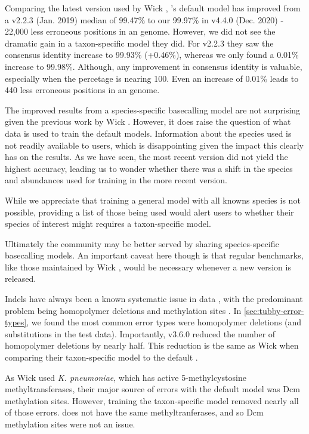 Comparing the latest version used by Wick \etal{}, \guppy{}'s default model has improved from a v2.2.3 (Jan. 2019) median of 99.47\% to our 99.97\% in v4.4.0 (Dec. 2020) - 22,000 less erroneous positions in an \mtb{} genome. However, we did not see the dramatic gain in a taxon-specific model they did. For \guppy{} v2.2.3 they saw the consensus identity increase to 99.93\% (+0.46\%), whereas we only found a 0.01\% increase to 99.98\%. Although, any improvement in consensus identity is valuable, especially when the percetage is nearing 100. Even an increase of 0.01\% leads to 440 less erroneous positions in an \mtb{} genome.

\noindent
The improved results from a species-specific basecalling model are not surprising given the previous work by Wick \etal{} \cite{wick2019}. However, it does raise the question of what data is used to train the default \guppy{} models. Information about the species used is not readily available to users, which is disappointing given the impact this clearly has on the results. As we have seen, the most recent \guppy{} version did not yield the highest accuracy, leading us to wonder whether there was a shift in the species and abundances used for training in the more recent version.

While we appreciate that training a general model with all knowns species is not possible, providing a list of those being used would alert users to whether their species of interest might requires a taxon-specific model.

Ultimately the \ont{} community may be better served by sharing species-specific basecalling models. An important caveat here though is that regular benchmarks, like those maintained by Wick \etal{} \cite{wick2019,wick2020}, would be necessary whenever a new \guppy{} version is released. 

\noindent
Indels have always been a known systematic issue in \ont{} data \cite{watson2019}, with the predominant problem being homopolymer deletions and methylation sites \cite{wick2019,jain2018}. In \autoref{sec:tubby-error-types}, we found the most common error types were homopolymer deletions (and substitutions in the test data). Importantly, \tubby{} v3.6.0 reduced the number of homopolymer deletions by nearly half. This reduction is the same as Wick \etal{} when comparing their taxon-specific model to the default \guppy{}. 

As Wick \etal{} used \textit{K. pneumoniae}, which has active 5-methylcystosine methyltransferases, their major source of errors with the default \guppy{} model was Dcm methylation sites. However, training the taxon-specific model removed nearly all of those errors. \mtb{} does not have the same methyltranferases, and so Dcm methylation sites were not an issue.

